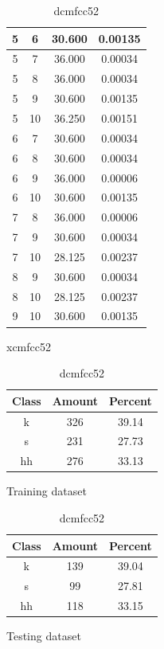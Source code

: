 \begin{table}
\begin{subtable}[tbp]{0.45\textwidth}
{\begin{tabular}{|c|c|c|c|}
 5 & 6 & 30.600 & 0.00135\\ \hline 
 5 & 7 & 36.000 & 0.00034\\ \hline 
 5 & 8 & 36.000 & 0.00034\\ \hline 
 5 & 9 & 30.600 & 0.00135\\ \hline 
 5 & 10 & 36.250 & 0.00151\\ \hline 
 6 & 7 & 30.600 & 0.00034\\ \hline 
 6 & 8 & 30.600 & 0.00034\\ \hline 
 6 & 9 & 36.000 & 0.00006\\ \hline 
 6 & 10 & 30.600 & 0.00135\\ \hline 
 7 & 8 & 36.000 & 0.00006\\ \hline 
 7 & 9 & 30.600 & 0.00034\\ \hline 
 7 & 10 & 28.125 & 0.00237\\ \hline 
 8 & 9 & 30.600 & 0.00034\\ \hline 
 8 & 10 & 28.125 & 0.00237\\ \hline 
 9 & 10 & 30.600 & 0.00135\\ \hline 

\end{tabular}
} \label{xlmfcc52}
\caption{xcmfcc52}
\end{subtable}

\begin{subtable}[tbp]{0.45\textwidth}
\centering
\begin{tabular}{|c|c|c|}
\hline
Class & Amount & Percent\\ \hline
k & 326 & 39.14\\ \hline
s & 231 & 27.73\\ \hline
hh & 276 & 33.13\\ \hline
\end{tabular}
\caption{Training dataset}
\end{subtable}
\hfill
\begin{subtable}[tbp]{0.45\textwidth}
\centering
\begin{tabular}{|c|c|c|}
\hline
Class & Amount & Percent\\ \hline
k & 139 & 39.04\\ \hline
s & 99 & 27.81\\ \hline
hh & 118 & 33.15\\ \hline
\end{tabular}
\caption{Testing dataset}
\end{subtable}
\hfill

\label{dlmfcc52}

\caption{dcmfcc52}

\end{table}\clearpage
